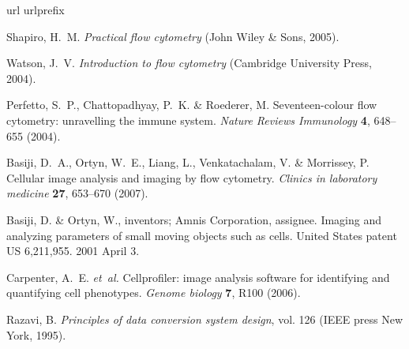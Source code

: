 \documentclass[aps,pra,reprint,superscriptaddress]{revtex4-1}
\begin{document}
% 
% 
\begin{thebibliography}{10}
\expandafter\ifx\csname url\endcsname\relax
  \def\url#1{\texttt{#1}}\fi
\expandafter\ifx\csname urlprefix\endcsname\relax\def\urlprefix{URL }\fi
\providecommand{\bibinfo}[2]{#2}
\providecommand{\eprint}[2][]{\url{#2}}

\bibinfo{author}{Shapiro, H.~M.}
\newblock \emph{\bibinfo{title}{Practical flow cytometry}}
  (\bibinfo{publisher}{John Wiley \& Sons}, \bibinfo{year}{2005}).

\bibinfo{author}{Watson, J.~V.}
\newblock \emph{\bibinfo{title}{Introduction to flow cytometry}}
  (\bibinfo{publisher}{Cambridge University Press}, \bibinfo{year}{2004}).

\bibinfo{author}{Perfetto, S.~P.}, \bibinfo{author}{Chattopadhyay, P.~K.} \&
  \bibinfo{author}{Roederer, M.}
\newblock \bibinfo{title}{Seventeen-colour flow cytometry: unravelling the
  immune system}.
\newblock \emph{\bibinfo{journal}{Nature Reviews Immunology}}
  \textbf{\bibinfo{volume}{4}}, \bibinfo{pages}{648--655}
  (\bibinfo{year}{2004}).

\bibinfo{author}{Basiji, D.~A.}, \bibinfo{author}{Ortyn, W.~E.},
  \bibinfo{author}{Liang, L.}, \bibinfo{author}{Venkatachalam, V.} \&
  \bibinfo{author}{Morrissey, P.}
\newblock \bibinfo{title}{Cellular image analysis and imaging by flow
  cytometry}.
\newblock \emph{\bibinfo{journal}{Clinics in laboratory medicine}}
  \textbf{\bibinfo{volume}{27}}, \bibinfo{pages}{653--670}
  (\bibinfo{year}{2007}).

\bibinfo{author}{Basiji, D.} \& \bibinfo{author}{Ortyn, W.}, inventors; Amnis Corporation, assignee. 
\newblock \bibinfo{title}{Imaging and analyzing parameters of small moving
  objects such as cells}.
\newblock \bibinfo{note}{United States patent US 6,211,955}. \bibinfo{year}{2001} \bibinfo{month}{April} 3.


\bibinfo{author}{Carpenter, A.~E.} \emph{et~al.}
\newblock \bibinfo{title}{Cellprofiler: image analysis software for identifying
  and quantifying cell phenotypes}.
\newblock \emph{\bibinfo{journal}{Genome biology}}
  \textbf{\bibinfo{volume}{7}}, \bibinfo{pages}{R100} (\bibinfo{year}{2006}).

\bibinfo{author}{Razavi, B.}
\newblock \emph{\bibinfo{title}{Principles of data conversion system design}},
  vol. \bibinfo{volume}{126} (\bibinfo{publisher}{IEEE press New York},
  \bibinfo{year}{1995}).


\end{thebibliography}
\end{document}
